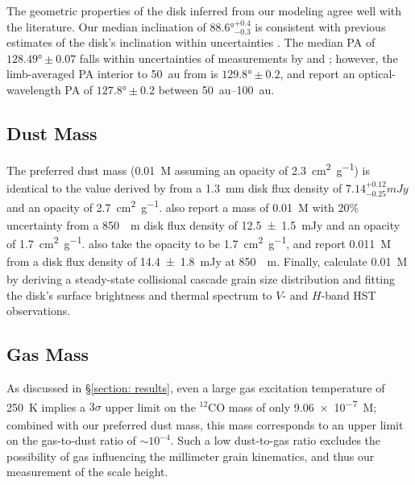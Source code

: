 \documentclass[modern]{aastex62}
\begin{document}
The geometric properties of the disk inferred from our modeling agree well with the literature. 
Our median inclination of $\ang[angle-symbol-over-decimal]{88.6}^{+0.4}_{-0.3}$ is consistent with previous estimates of the disk's inclination within uncertainties \citep{metchev05,krist05}.
The median PA of $\ang[angle-symbol-over-decimal]{128.49} \pm 0.07$ falls within uncertainties of measurements by \cite{macgregor13} and \cite{krist05}; however, the limb-averaged PA interior to \SI{50}{au} from \cite{metchev05} is $\ang[angle-symbol-over-decimal]{129.8} \pm 0.2$, and \cite{schneider14} report an optical-wavelength PA of $\ang[angle-symbol-over-decimal]{127.8} \pm 0.2$ between \SIrange{50}{100}{au}.

\subsection{Dust Mass}
\label{subsection: dust mass}

The preferred dust mass (\SI{0.01}{M_\earth} assuming an opacity of \SI{2.3}{cm^2.g^{-1}}) is identical to the value derived by \cite{macgregor13} from a \SI{1.3}{mm} disk flux density of $7.14^{+0.12}_{-0.25} \si{mJy}$ and an opacity of \SI{2.7}{cm^2.g^{-1}}.
\cite{matthews15} also report a mass of \SI{0.01}{M_\earth} with 20\% uncertainty from a \SI{850}{\mu m} disk flux density of \SI{12.5 \pm 1.5}{mJy} and an opacity of \SI{1.7}{cm^2.g^{-1}}.
\cite{liu04} also take the opacity to be \SI{1.7}{cm^2.g^{-1}}, and report \SI{0.011}{M_\earth} from a disk flux density of \SI{14.4 \pm 1.8}{mJy} at \SI{850}{\mu m}.
Finally, \cite{strubbe&chiang06} calculate \SI{0.01}{M_\earth} by deriving a steady-state collisional cascade grain size distribution and fitting the disk's surface brightness and thermal spectrum to $V$- and $H$-band HST observations.


\subsection{Gas Mass}
\label{subsection: gas mass}

As discussed in \S \ref{section: results}, even a large gas excitation temperature of \SI{250}{K} implies a $3 \sigma$ upper limit on the $^{12}$CO mass of only \SI{9.06e-7}{M_\earth}; combined with our preferred dust mass, this mass corresponds to an upper limit on the gas-to-dust ratio of $\sim 10^{-4}$.
Such a low dust-to-gas ratio excludes the possibility of gas influencing the millimeter grain kinematics, and thus our measurement of the scale height.
\end{document}
